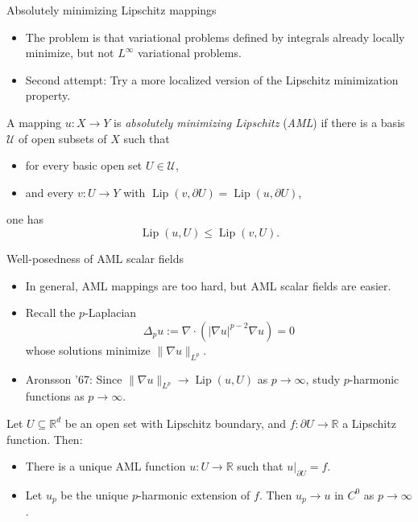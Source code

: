\documentclass[10pt]{beamer}
\newcommand{\RR}{\mathbb{R}}
\DeclareMathOperator{\Lip}{Lip}
\begin{document}
\begin{frame}{Absolutely minimizing Lipschitz mappings}
\begin{itemize}
\item The problem is that variational problems defined by integrals already locally minimize, but not $L^\infty$ variational problems. 
\item Second attempt: Try a more localized version of the Lipschitz minimization property. 
\end{itemize}

\begin{definition}
A mapping $u: X \to Y$ is \emph{absolutely minimizing Lipschitz} (\emph{AML}) if there is a basis $\mathscr U$ of open subsets of $X$ such that
\begin{itemize}
\item for every basic open set $U \in \mathscr U$,
\item and every $v: U \to Y$ with $\Lip(v, \partial U) = \Lip(u, \partial U)$, 
\end{itemize}
one has
$$\Lip(u, U) \leq \Lip(v, U).$$
\end{definition}
\end{frame}

\begin{frame}{Well-posedness of AML scalar fields}
\begin{itemize}
\item In general, AML mappings are too hard, but AML scalar fields are easier. 
\item Recall the $p$-Laplacian 
$$\Delta_p u := \nabla \cdot (|\nabla u|^{p - 2} \nabla u) = 0$$
whose solutions minimize $\|\nabla u\|_{L^p}$. 
\item Aronsson '67: Since $\|\nabla u\|_{L^p} \to \Lip(u, U)$ as $p \to \infty$, study $p$-harmonic functions as $p \to \infty$. 
\end{itemize}

\begin{theorem}
Let $U \subseteq \RR^d$ be an open set with Lipschitz boundary, and $f: \partial U \to \RR$ a Lipschitz function. Then: 
\begin{itemize}
\item There is a unique AML function $u: U \to \RR$ such that $u|_{\partial U} = f$. 
\item Let $u_p$ be the unique $p$-harmonic extension of $f$.
Then $u_p \to u$ in $C^0$ as $p \to \infty$.
\end{itemize}
\end{theorem}
\end{frame}
\end{document}
